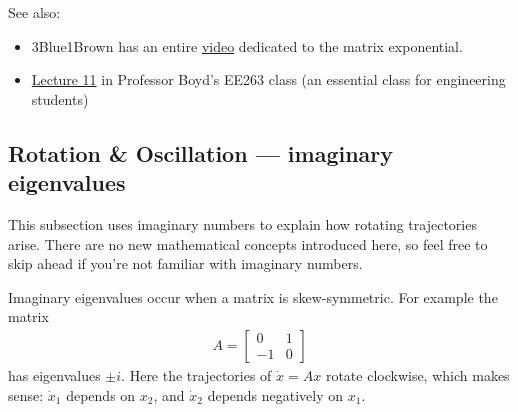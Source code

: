 \documentclass[11pt, oneside]{article}   	%
\begin{document}
See also:
\begin{itemize}
\item 3Blue1Brown has an entire \href{https://youtu.be/O85OWBJ2ayo}{video} dedicated to the matrix exponential.
\item \href{https://www.youtube.com/watch?v=5ePa2UOkEV0&list=PL06960BA52D0DB32B}{Lecture 11} in Professor Boyd's EE263 class
(an essential class for engineering students)
\end{itemize}

\subsection*{Rotation \& Oscillation --- imaginary eigenvalues}
This subsection uses imaginary numbers to explain how rotating trajectories arise.
There are no new mathematical concepts introduced here,
so feel free to skip ahead if you're not familiar with imaginary numbers.

Imaginary eigenvalues occur when a matrix is skew-symmetric.
For example the matrix
\begin{align} \nonumber
  A =
  \begin{bmatrix}
    0 & 1 \\
    -1 & 0
  \end{bmatrix}
\end{align}
has eigenvalues $\pm i$.
Here the trajectories of $\dot{x} = Ax$ rotate clockwise, which makes sense:
$\dot{x}_1$ depends on $x_2$, and $\dot{x}_2$ depends negatively on $x_1$.
\end{document}
